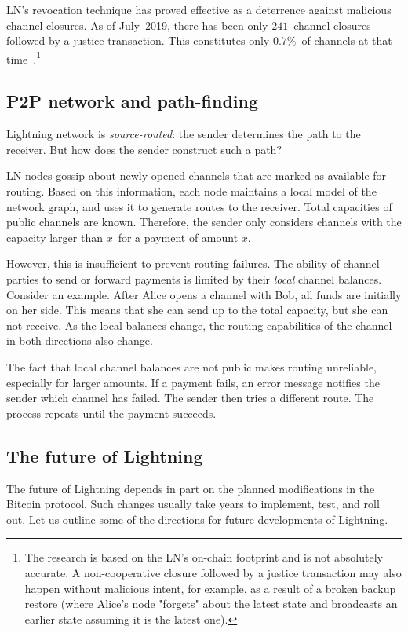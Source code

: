 LN's revocation technique has proved effective as a deterrence against malicious channel closures.
As of July~2019, there has been only $241$~channel closures followed by a justice transaction.
This constitutes only $0.7$\%~of channels at that time~\cite{BitMEXLN3}.\footnote{The research is based on the LN's on-chain footprint and is not absolutely accurate. A non-cooperative closure followed by a justice transaction may also happen without malicious intent, for example, as a result of a broken backup restore (where Alice's node "forgets" about the latest state and broadcasts an earlier state assuming it is the latest one).}


\subsection{P2P network and path-finding}

Lightning network is \textit{source-routed}: the sender determines the path to the receiver.
But how does the sender construct such a path?

LN nodes gossip about newly opened channels that are marked as available for routing.
Based on this information, each node maintains a local model of the network graph, and uses it to generate routes to the receiver.
Total capacities of public channels are known.
Therefore, the sender only considers channels with the capacity larger than $x$~for a payment of amount $x$.

However, this is insufficient to prevent routing failures.
The ability of channel parties to send or forward payments is limited by their \textit{local} channel balances.
Consider an example.
After Alice opens a channel with Bob, all funds are initially on her side.
This means that she can send up to the total capacity, but she can not receive.
As the local balances change, the routing capabilities of the channel in both directions also change.

The fact that local channel balances are not public makes routing unreliable, especially for larger amounts.
If a payment fails, an error message notifies the sender which channel has failed.
The sender then tries a different route.
The process repeats until the payment succeeds.


\subsection{The future of Lightning}

The future of Lightning depends in part on the planned modifications in the Bitcoin protocol.
Such changes usually take years to implement, test, and roll out.
Let us outline some of the directions for future developments of Lightning.

